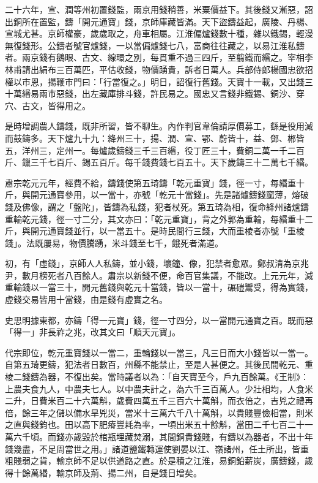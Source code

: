 \begin{pinyinscope}
 二十六年，宣、潤等州初置錢監，兩京用錢稍善，米粟價益下。其後錢又漸惡，詔出銅所在置監，鑄「開元通寶」錢，京師庫藏皆滿。天下盜鑄益起，廣陵、丹楊、宣城尤甚。京師權豪，歲歲取之，舟車相屬。江淮偏爐錢數十種，雜以鐵錫，輕漫無復錢形。公鑄者號官爐錢，一以當偏爐錢七八，富商往往藏之，以易江淮私鑄者。兩京錢有鵝眼、古文、線環之別，每貫重不過三四斤，至翦鐵而緡之。宰相李林甫請出絹布三百萬匹，平估收錢，物價踴貴，訴者日萬人。兵部侍郎楊國忠欲招權以市恩，揚鞭市門曰：「行當復之。」明日，詔復行舊錢。天寶十一載，又出錢三十萬緡易兩市惡錢，出左藏庫排斗錢，許民易之。國忠又言錢非鐵錫、銅沙、穿穴、古文，皆得用之。



 是時增調農人鑄錢，既非所習，皆不聊生。內作判官韋倫請厚價募工，繇是役用減而鼓鑄多。天下爐九十九：絳州三十，揚、潤、宣、鄂、蔚皆十，益、鄧、郴皆五，洋州三，定州一。每爐歲鑄錢三千三百緡，役丁匠三十，費銅二萬一千二百斤、鑞三千七百斤、錫五百斤。每千錢費錢七百五十。天下歲鑄三十二萬七千緡。



 肅宗乾元元年，經費不給，鑄錢使第五琦鑄「乾元重寶」錢，徑一寸，每緡重十斤，與開元通寶參用，以一當十，亦號「乾元十當錢」。先是諸爐鑄錢窳薄，熔破錢及佛像，謂之「盤陀」，皆鑄為私錢，犯者杖死。第五琦為相，復命絳州諸爐鑄重輪乾元錢，徑一寸二分，其文亦曰：「乾元重寶」，背之外郭為重輪，每緡重十二斤，與開元通寶錢並行，以一當五十。是時民間行三錢，大而重棱者亦號「重棱錢」。法既屢易，物價騰踴，米斗錢至七千，餓死者滿道。



 初，有「虛錢」，京師人人私鑄，並小錢，壞鐘、像，犯禁者愈眾。鄭叔清為京兆尹，數月榜死者八百餘人。肅宗以新錢不便，命百官集議，不能改。上元元年，減重輪錢以一當三十，開元舊錢與乾元十當錢，皆以一當十，碾磑鬻受，得為實錢，虛錢交易皆用十當錢，由是錢有虛實之名。



 史思明據東都，亦鑄「得一元寶」錢，徑一寸四分，以一當開元通寶之百。既而惡「得一」非長祚之兆，改其文曰「順天元寶」。



 代宗即位，乾元重寶錢以一當二，重輪錢以一當三，凡三日而大小錢皆以一當一。自第五琦更鑄，犯法者日數百，州縣不能禁止，至是人甚便之。其後民間乾元、重棱二錢鑄為器，不復出矣。當時議者以為：「自天寶至今，戶九百餘萬。《王制》：上農夫食九人，中農夫七人。以中農夫計之，為六千三百萬人。少壯相均，人食米二升，日費米百二十六萬斛，歲費四萬五千三百六十萬斛，而衣倍之，吉兇之禮再倍，餘三年之儲以備水旱兇災，當米十三萬六千八十萬斛，以貴賤豐儉相當，則米之直與錢鈞也。田以高下肥瘠豐耗為率，一頃出米五十餘斛，當田二千七百二十一萬六千頃。而錢亦歲毀於棺瓶埋藏焚溺，其間銅貴錢賤，有鑄以為器者，不出十年錢幾盡，不足周當世之用。」諸道鹽鐵轉運使劉晏以江、嶺諸州，任土所出，皆重粗賤弱之貨，輸京師不足以供道路之直。於是積之江淮，易銅鉛薪炭，廣鑄錢，歲得十餘萬緡，輸京師及荊、揚二州，自是錢日增矣。




\end{pinyinscope}
